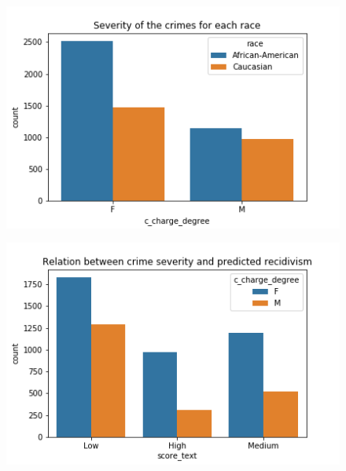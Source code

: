 \documentclass[11pt, fleqn, titlepage]{article}
\begin{document}
	\begin{figure}[H]
		\centering
		\includegraphics[width=0.5\linewidth]{imgs/c_charge_degree}
		\caption{}
	\end{figure}
	
	\begin{figure}[H]
		\centering
		\includegraphics[width=0.5\linewidth]{imgs/charge_degree_score}
		\caption{}
	\end{figure}
\end{document}
